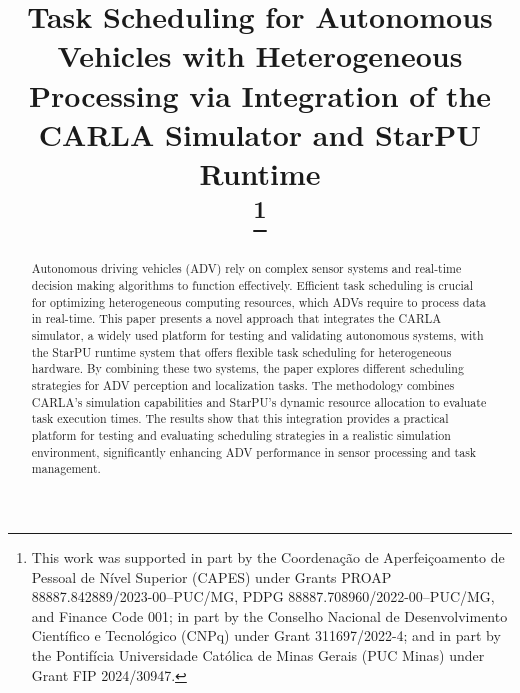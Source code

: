 \documentclass[conference]{IEEEtran}
\begin{document}
\title{Task Scheduling for Autonomous Vehicles with Heterogeneous Processing via Integration of the CARLA Simulator and StarPU Runtime\\
\thanks{This work was supported in part by the Coordenação de Aperfeiçoamento de Pessoal de Nível Superior (CAPES) under Grants PROAP 88887.842889/2023-00--PUC/MG, PDPG 88887.708960/2022-00--PUC/MG, and Finance Code 001; in part by the Conselho Nacional de Desenvolvimento Científico e Tecnológico (CNPq) under Grant 311697/2022-4; and in part by the Pontifícia Universidade Católica de Minas Gerais (PUC Minas) under Grant FIP 2024/30947.}
}

\author{
\and
{}
}

\maketitle

\begin{abstract}
Autonomous driving vehicles (ADV) rely on complex sensor systems and real-time decision making algorithms to function effectively. Efficient task scheduling is crucial for optimizing heterogeneous computing resources, which ADVs require to process data in real-time. This paper presents a novel approach that integrates the CARLA simulator, a widely used platform for testing and validating autonomous systems, with the StarPU runtime system that offers flexible task scheduling for heterogeneous hardware. By combining these two systems, the paper explores different scheduling strategies for ADV perception and localization tasks. The methodology combines CARLA's simulation capabilities and StarPU's dynamic resource allocation to evaluate task execution times. The results show that this integration provides a practical platform for testing and evaluating scheduling strategies in a realistic simulation environment, significantly enhancing ADV performance in sensor processing and task management. 
\end{abstract}
\end{document}
